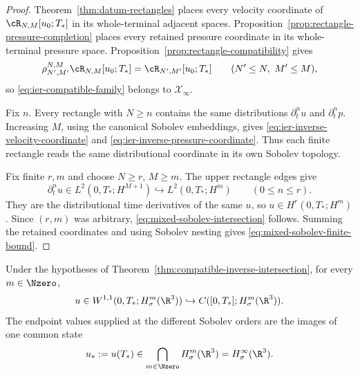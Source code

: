 \begin{proof}
Theorem~\ref{thm:datum-rectangles} places every velocity coordinate of
\(\cR_{N,M}[u_0;T_*]\) in its whole-terminal adjacent spaces.
Proposition~\ref{prop:rectangle-pressure-completion} places every retained
pressure coordinate in its whole-terminal pressure space.
Proposition~\ref{prop:rectangle-compatibility} gives
\[
 \rho_{N',M'}^{N,M}\cR_{N,M}[u_0;T_*]
 =\cR_{N',M'}[u_0;T_*]
 \qquad(N'\le N,\ M'\le M),
\]
so \eqref{eq:ier-compatible-family} belongs to \(\mathscr X_\infty\).

Fix \(n\).  Every rectangle with \(N\ge n\) contains the same distributions
\(\partial_t^nu\) and \(\partial_t^np\).  Increasing \(M\), using the
canonical Sobolev embeddings, gives
\eqref{eq:ier-inverse-velocity-coordinate} and
\eqref{eq:ier-inverse-pressure-coordinate}.  Thus each finite rectangle reads
the same distributional coordinate in its own Sobolev topology.

Fix finite \(r,m\) and choose \(N\ge r\), \(M\ge m\).  The upper rectangle
edges give
\[
 \partial_t^nu\in L^2(0,T_*;H^{M+1})
 \hookrightarrow L^2(0,T_*;H^m)
 \qquad(0\le n\le r).
\]
They are the distributional time derivatives of the same \(u\), so
\(u\in H^r(0,T_*;H^m)\).  Since \((r,m)\) was arbitrary,
\eqref{eq:mixed-sobolev-intersection} follows.  Summing the retained
coordinates and using Sobolev nesting gives
\eqref{eq:mixed-sobolev-finite-bound}.
\end{proof}

\begin{proposition}
\label{prop:ier-complete-spatial-endpoint}
Under the hypotheses of
Theorem~\ref{thm:compatible-inverse-intersection}, for every
\(m\in\Nzero\),
\begin{equation}
 u\in W^{1,1}(0,T_*;H^m_\sigma(\R^3))
 \hookrightarrow C([0,T_*];H^m_\sigma(\R^3)).
 \label{eq:ier-spatial-row-W11}
\end{equation}
The endpoint values supplied at the different Sobolev orders are the images
of one common state
\begin{equation}
 u_*:=u(T_*)\in\bigcap_{m\in\Nzero}H^m_\sigma(\R^3)
 =H^\infty_\sigma(\R^3).
 \label{eq:ier-common-spatial-endpoint}
\end{equation}
\end{proposition}

